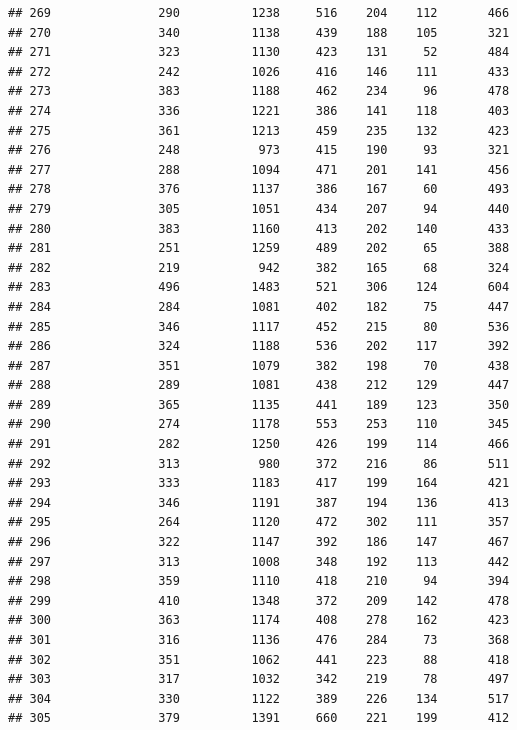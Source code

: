 \documentclass[]{book}
\begin{document}
\begin{verbatim}
## 269               290          1238     516    204    112       466
## 270               340          1138     439    188    105       321
## 271               323          1130     423    131     52       484
## 272               242          1026     416    146    111       433
## 273               383          1188     462    234     96       478
## 274               336          1221     386    141    118       403
## 275               361          1213     459    235    132       423
## 276               248           973     415    190     93       321
## 277               288          1094     471    201    141       456
## 278               376          1137     386    167     60       493
## 279               305          1051     434    207     94       440
## 280               383          1160     413    202    140       433
## 281               251          1259     489    202     65       388
## 282               219           942     382    165     68       324
## 283               496          1483     521    306    124       604
## 284               284          1081     402    182     75       447
## 285               346          1117     452    215     80       536
## 286               324          1188     536    202    117       392
## 287               351          1079     382    198     70       438
## 288               289          1081     438    212    129       447
## 289               365          1135     441    189    123       350
## 290               274          1178     553    253    110       345
## 291               282          1250     426    199    114       466
## 292               313           980     372    216     86       511
## 293               333          1183     417    199    164       421
## 294               346          1191     387    194    136       413
## 295               264          1120     472    302    111       357
## 296               322          1147     392    186    147       467
## 297               313          1008     348    192    113       442
## 298               359          1110     418    210     94       394
## 299               410          1348     372    209    142       478
## 300               363          1174     408    278    162       423
## 301               316          1136     476    284     73       368
## 302               351          1062     441    223     88       418
## 303               317          1032     342    219     78       497
## 304               330          1122     389    226    134       517
## 305               379          1391     660    221    199       412

\end{verbatim}
\end{document}
